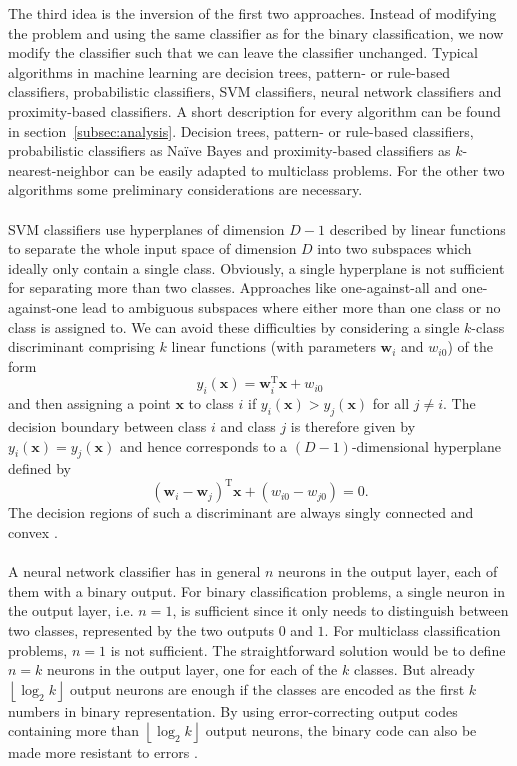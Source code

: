\documentclass[article,type=msc,colorback,accentcolor=tud7b]{tudthesis}
\begin{document}
\begin{itemize}
        The third idea is the inversion of the first two approaches. Instead of modifying the problem and using the same classifier as for the binary classification, we now modify the classifier such that we can leave the classifier unchanged. Typical algorithms in machine learning are decision trees, pattern- or rule-based classifiers, probabilistic classifiers, SVM classifiers, neural network classifiers and proximity-based classifiers. A short description for every algorithm can be found in section~\ref{subsec:analysis}. Decision trees, pattern- or rule-based classifiers, probabilistic classifiers as Naïve Bayes and proximity-based classifiers as $k$-nearest-neighbor can be easily adapted to multiclass problems. For the other two algorithms some preliminary considerations are necessary. \\\\
        SVM classifiers use hyperplanes of dimension $D-1$ described by linear functions to separate the whole input space of dimension $D$ into two subspaces which ideally only contain a single class. Obviously, a single hyperplane is not sufficient for separating more than two classes. Approaches like one-against-all and one-against-one lead to ambiguous subspaces where either more than one class or no class is assigned to. We can avoid these difficulties by considering a single $k$-class discriminant comprising $k$ linear functions (with parameters $\mathbf{w}_{i}$ and $w_{i 0}$) of the form
        \[y_{i}(\mathbf{x})=\mathbf{w}_{i}^{\mathrm{T}} \mathbf{x}+w_{i 0}\]
        and then assigning a point $\mathbf{x}$ to class $i$ if $y_{i}(\mathbf{x})>y_{j}(\mathbf{x})$ for all $j\neq i$. The decision boundary between class $i$ and class $j$ is therefore given by $y_{i}(\mathbf{x})=y_{j}(\mathbf{x})$ and hence corresponds to a $(D-1)$-dimensional hyperplane defined by
        \[\left(\mathbf{w}_{i}-\mathbf{w}_{j}\right)^{\mathrm{T}} \mathbf{x}+\left(w_{i 0}-w_{j 0}\right)=0.\]
        The decision regions of such a discriminant are always singly connected and convex \autocite[section~4.1.2]{Bishop2006}. \\\\
        A neural network classifier has in general $n$ neurons in the output layer, each of them with a binary output. For binary classification problems, a single neuron in the output layer, i.e. $n=1$, is sufficient since it only needs to distinguish between two classes, represented by the two outputs $0$ and $1$. For multiclass classification problems, $n=1$ is not sufficient. The straightforward solution would be to define $n=k$ neurons in the output layer, one for each of the $k$ classes. But already $\left\lfloor\log_{2}k\right\rfloor$ output neurons are enough if the classes are encoded as the first $k$ numbers in binary representation. By using error-correcting output codes containing more than $\left\lfloor\log_{2}k\right\rfloor$ output neurons, the binary code can also be made more resistant to errors \autocite[section~2.1]{Aly2005}.
    \end{itemize}
\end{document}
